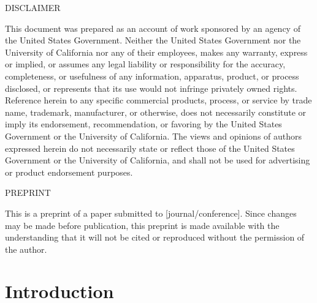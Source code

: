 \vspace*{1.0in}

\scriptsize
\begin{center}
\begin{minipage}{4.0in}

\begin{center}

DISCLAIMER
\end{center}

This document was prepared as an account of work sponsored by an
agency of the United States Government.
Neither the United States Government nor the University of California
nor any of their employees, makes any warranty, express or implied, or
assumes any legal liability or responsibility for the accuracy,
completeness, or usefulness of any information, apparatus, product, or
process disclosed, or represents that its use would not infringe
privately owned rights.
Reference herein to any specific commercial products, process, or
service by trade name, trademark, manufacturer, or otherwise, does not
necessarily constitute or imply its endorsement, recommendation, or
favoring by the United States Government or the University of
California.
The views and opinions of authors expressed herein do not necessarily
state or reflect those of the United States Government or the
University of California, and shall not be used for advertising or
product endorsement purposes.  

\par\vspace*{1.0in}

\begin{center}
PREPRINT
\end{center}

This is a preprint of a paper submitted to [journal/conference].  
Since changes may be made before publication, this preprint is made
available with the understanding that it will not be cited or
reproduced without the permission of the author.
\end{minipage}
\end{center}

\normalsize



\maketitle

\setcounter{page}{1}

\section{Introduction}

